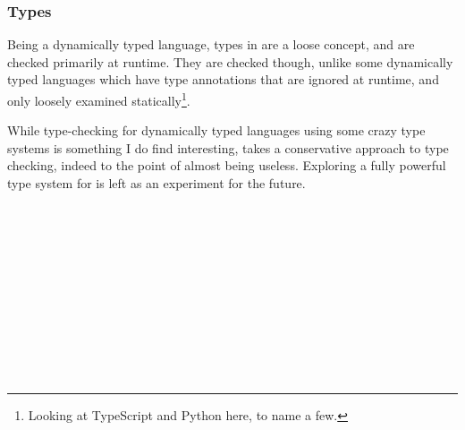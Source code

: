 \subsubsection{Types}

Being a dynamically typed language, types in \Trilogy{} are a loose concept,
and are checked primarily at runtime. They are checked though, unlike some
dynamically typed languages which have type annotations that are
ignored at runtime, and only loosely examined statically\footnote{Looking at TypeScript and Python here, to name a few.}.

While type-checking for dynamically typed languages using some crazy
type systems is something I do find interesting, \Trilogy{} takes a
conservative approach to type checking, indeed to the point of almost
being useless. Exploring a fully powerful type system for \Trilogy{}
is left as an experiment for the future.

\begin{bnf*}
     \\
     \\
     \\
     \\
     \\
     \\
     \\
     \\
     \\
     \\
\end{bnf*}


